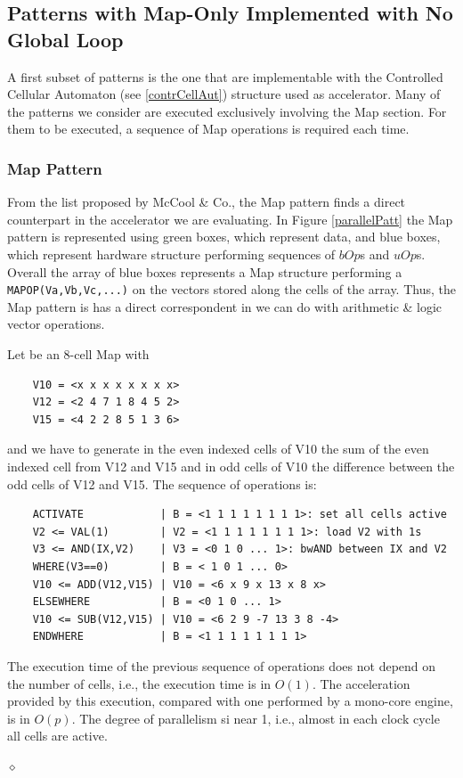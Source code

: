 \subsection{Patterns with Map-Only Implemented with No Global Loop}

A first subset of patterns is the one that are implementable with the Controlled Cellular Automaton (see \ref{contrCellAut}) structure used as accelerator. Many of the patterns we consider are executed exclusively involving the Map section. For them to be executed, a sequence of Map operations is required each time.

\subsubsection{Map Pattern}

From the list proposed by McCool \& Co., the Map pattern finds a direct counterpart in the accelerator we are evaluating. In Figure \ref{parallelPatt} the Map pattern is represented using green boxes, which represent data, and blue boxes, which represent hardware structure performing sequences of $bOp$s and $uOp$s. Overall the array of blue boxes represents a Map structure performing a {\tt MAPOP(Va,Vb,Vc,...)} on the vectors stored along the cells of the array. Thus, the Map pattern is has a direct correspondent in we can do with arithmetic \& logic vector operations. 

\begin{exemplu}
Let be an $8$-cell Map with 
\begin{verbatim}
    V10 = <x x x x x x x x>
    V12 = <2 4 7 1 8 4 5 2>
    V15 = <4 2 2 8 5 1 3 6>
\end{verbatim}
and we have to generate in the even indexed cells of V10 the sum of  the even indexed cell from V12 and V15 and in odd cells of V10 the difference between the odd cells of V12 and V15. The sequence of operations is:
\begin{verbatim}
    ACTIVATE            | B = <1 1 1 1 1 1 1 1>: set all cells active
    V2 <= VAL(1)        | V2 = <1 1 1 1 1 1 1 1>: load V2 with 1s
    V3 <= AND(IX,V2)    | V3 = <0 1 0 ... 1>: bwAND between IX and V2 
    WHERE(V3==0)        | B = < 1 0 1 ... 0>
    V10 <= ADD(V12,V15) | V10 = <6 x 9 x 13 x 8 x>
    ELSEWHERE           | B = <0 1 0 ... 1> 
    V10 <= SUB(V12,V15) | V10 = <6 2 9 -7 13 3 8 -4>
    ENDWHERE            | B = <1 1 1 1 1 1 1 1>
\end{verbatim}
The execution time of the previous sequence of operations does not depend on the number of cells, i.e., the execution time is in $O(1)$. The acceleration provided by this execution, compared with one performed by a mono-core engine, is in $O(p)$. The degree of parallelism si near 1, i.e., almost  in each clock cycle all cells are active. 

$\diamond$
\end{exemplu}

